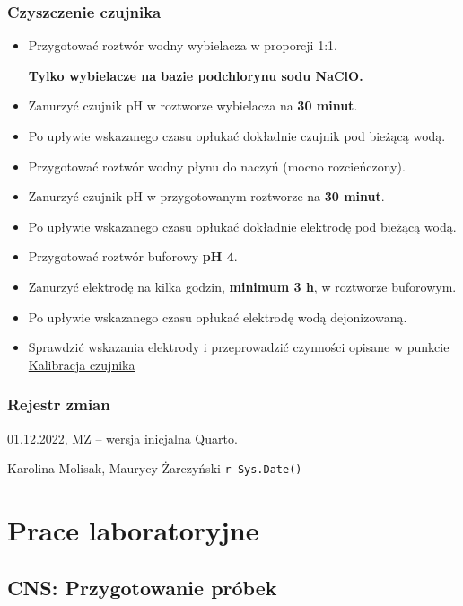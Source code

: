 \documentclass[
  letterpaper,
  DIV=11,
  numbers=noendperiod]{scrreprt}
\begin{document}
\hypertarget{czyszczenie}{%
\section{Czyszczenie czujnika}\label{czyszczenie}}

\begin{itemize}
\item
  Przygotować roztwór wodny wybielacza w proporcji 1:1.

  \textbf{Tylko wybielacze na bazie podchlorynu sodu NaClO.}
\item
  Zanurzyć czujnik pH w roztworze wybielacza na \textbf{30 minut}.
\item
  Po upływie wskazanego czasu opłukać dokładnie czujnik pod bieżącą
  wodą.
\item
  Przygotować roztwór wodny płynu do naczyń (mocno rozcieńczony).
\item
  Zanurzyć czujnik pH w przygotowanym roztworze na \textbf{30 minut}.
\item
  Po upływie wskazanego czasu opłukać dokładnie elektrodę pod bieżącą
  wodą.
\item
  Przygotować roztwór buforowy \textbf{pH 4}.
\item
  Zanurzyć elektrodę na kilka godzin, \textbf{minimum 3 h}, w roztworze
  buforowym.
\item
  Po upływie wskazanego czasu opłukać elektrodę wodą dejonizowaną.
\item
  Sprawdzić wskazania elektrody i przeprowadzić czynności opisane w
  punkcie \protect\hyperlink{kalibracja}{Kalibracja czujnika} \newpage{}
\end{itemize}

\hypertarget{rejestr-zmian-2}{%
\section{Rejestr zmian}\label{rejestr-zmian-2}}

01.12.2022, MZ -- wersja inicjalna Quarto.

Karolina Molisak, Maurycy Żarczyński \texttt{r\ Sys.Date()}

\part{Prace laboratoryjne}

\hypertarget{cns-przygotowanie-pruxf3bek}{%
\chapter{CNS: Przygotowanie próbek}\label{cns-przygotowanie-pruxf3bek}}
\end{document}

